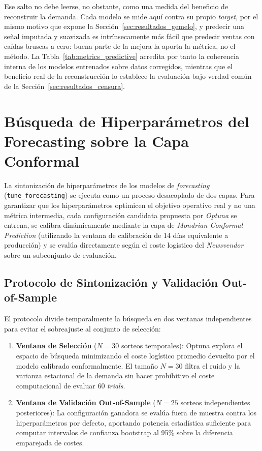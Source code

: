 Ese salto no debe leerse, no obstante, como una medida del beneficio de reconstruir la demanda. Cada modelo se mide aquí contra su propio \textit{target}, por el mismo motivo que expone la Sección~\ref{sec:resultados_gemelo}, y predecir una señal imputada y suavizada es intrínsecamente más fácil que predecir ventas con caídas bruscas a cero: buena parte de la mejora la aporta la métrica, no el método. La Tabla~\ref{tab:metrics_predictive} acredita por tanto la coherencia interna de los modelos entrenados sobre datos corregidos, mientras que el beneficio real de la reconstrucción lo establece la evaluación bajo verdad común de la Sección~\ref{sec:resultados_censura}.


\section{Búsqueda de Hiperparámetros del Forecasting sobre la Capa Conformal}
\label{sec:resultados_tuning_forecasting}

La sintonización de hiperparámetros de los modelos de \textit{forecasting} (\texttt{tune\_forecasting}) se ejecuta como un proceso desacoplado de dos capas. Para garantizar que los hiperparámetros optimicen el objetivo operativo real y no una métrica intermedia, cada configuración candidata propuesta por \textit{Optuna} \cite{akiba2019optuna} se entrena, se calibra dinámicamente mediante la capa de \textit{Mondrian Conformal Prediction} (utilizando la ventana de calibración de 14 días equivalente a producción) y se evalúa directamente según el coste logístico del \textit{Newsvendor} sobre un subconjunto de evaluación.

\subsection{Protocolo de Sintonización y Validación Out-of-Sample}
\label{sec:tuning_protocol_oos}

El protocolo divide temporalmente la búsqueda en dos ventanas independientes para evitar el sobreajuste al conjunto de selección:
\begin{enumerate}
    \item \textbf{Ventana de Selección} ($N=30$ sorteos temporales): Optuna explora el espacio de búsqueda minimizando el coste logístico promedio devuelto por el modelo calibrado conformalmente. El tamaño $N=30$ filtra el ruido y la varianza estacional de la demanda sin hacer prohibitivo el coste computacional de evaluar 60 \textit{trials}.
    \item \textbf{Ventana de Validación Out-of-Sample} ($N=25$ sorteos independientes posteriores): La configuración ganadora se evalúa fuera de muestra contra los hiperparámetros por defecto, aportando potencia estadística suficiente para computar intervalos de confianza bootstrap al 95\% sobre la diferencia emparejada de costes.
\end{enumerate}

